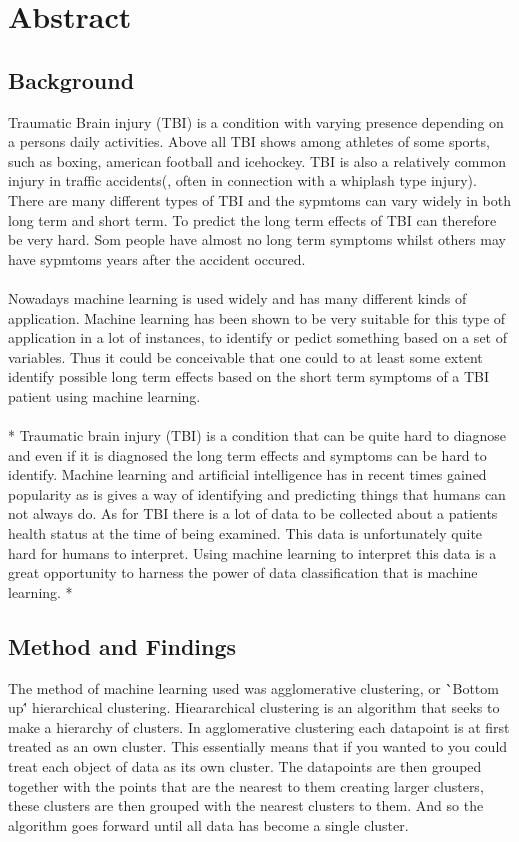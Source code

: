 \documentclass[11pt]{article}
\begin{document}
\section*{Abstract}

\subsection*{Background}

Traumatic Brain injury (TBI) is a condition with varying presence depending on a persons daily activities. Above all TBI shows among athletes of some sports, such as boxing, american football and icehockey. TBI is also a relatively common injury in traffic accidents(, often in connection with a whiplash type injury). There are many different types of TBI and the sypmtoms can vary widely in both long term and short term. To predict the long term effects of TBI can therefore be very hard. Som people have almost no long term symptoms whilst others may have sypmtoms years after the accident occured.\\
\\
Nowadays machine learning is used widely and has many different kinds of application. Machine learning has been shown to be very suitable for this type of application in a lot of instances, to identify or pedict something based on a set of variables. Thus it could be conceivable that one could to at least some extent identify possible long term effects based on the short term symptoms of a TBI patient using machine learning.\\
\\
*
Traumatic brain injury (TBI) is a condition that can be quite hard to diagnose and even if it is diagnosed the long term effects and symptoms can be hard to identify. Machine learning and artificial intelligence has in recent times gained popularity as is gives a way of identifying and predicting things that humans can not always do. As for TBI there is a lot of data to be collected about a patients health status at the time of being examined. This data is unfortunately quite hard for humans to interpret. Using machine learning to interpret this data is a great opportunity to harness the power of data classification that is machine learning.
*

\subsection*{Method and Findings}
The method of machine learning used was agglomerative clustering, or \``Bottom up\'' hierarchical clustering. Hieararchical clustering is an algorithm that seeks to make a hierarchy of clusters.
In agglomerative clustering each datapoint is at first treated as an own cluster. This essentially means that if you wanted to you could treat each object of data as its own cluster. The datapoints are then grouped together with the points that are the nearest to them creating larger clusters, these clusters are then grouped with the nearest clusters to them. And so the algorithm goes forward until all data has become a single cluster.\cite{HierarchicalClustering2020}
\end{document}
